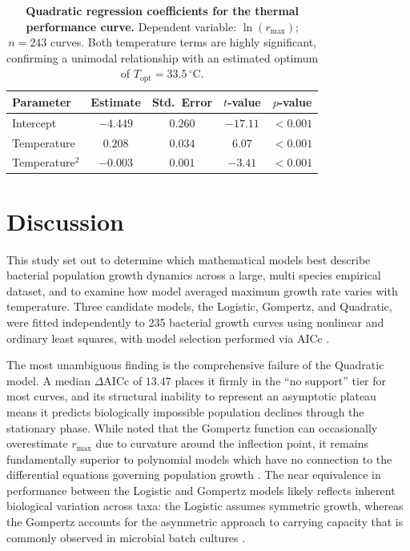 \documentclass[11pt,a4paper]{article}
\begin{document}
\begin{table}[H]
\centering
\caption{\textbf{Quadratic regression coefficients for the thermal
performance curve.} Dependent variable: $\ln(r_{\max})$; $n = 243$
curves. Both temperature terms are highly significant, confirming a
unimodal relationship with an estimated optimum of
$T_{\text{opt}} = 33.5\,^\circ$C.}
\label{tab:regression}
\begin{tabular}{lcccc}
\toprule
Parameter & Estimate & Std.\ Error & $t$-value & $p$-value \\
\midrule
Intercept             & $-4.449$ & $0.260$ & $-17.11$ & $<0.001$ \\
Temperature           & $0.208$  & $0.034$ & $6.07$   & $<0.001$ \\
Temperature$^2$       & $-0.003$ & $0.001$ & $-3.41$  & $<0.001$ \\
\bottomrule
\end{tabular}
\end{table}

\section{Discussion}

This study set out to determine which mathematical models best describe
bacterial population growth dynamics across a large, multi species
empirical dataset, and to examine how model averaged maximum growth rate
varies with temperature. Three candidate models, the Logistic, Gompertz,
and Quadratic, were fitted independently to 235 bacterial growth curves
using nonlinear and ordinary least squares, with model selection
performed via AICc \citep{burnham2002}.

The most unambiguous finding is the comprehensive failure of the
Quadratic model. A median $\Delta\text{AICc}$ of $13.47$ places it
firmly in the ``no support'' tier for most curves, and its structural
inability to represent an asymptotic plateau means it predicts
biologically impossible population declines through the stationary phase.
While \citet{Zwietering1990} noted that the Gompertz function can
occasionally overestimate $r_{\max}$ due to curvature around the
inflection point, it remains fundamentally superior to polynomial models
which have no connection to the differential equations governing
population growth \citep{baranyi1994}. The near equivalence in performance
between the Logistic and Gompertz models likely reflects inherent
biological variation across taxa: the Logistic assumes symmetric growth,
whereas the Gompertz accounts for the asymmetric approach to carrying
capacity that is commonly observed in microbial batch cultures
\citep{Zwietering1990,madigan2018}.
\end{document}
